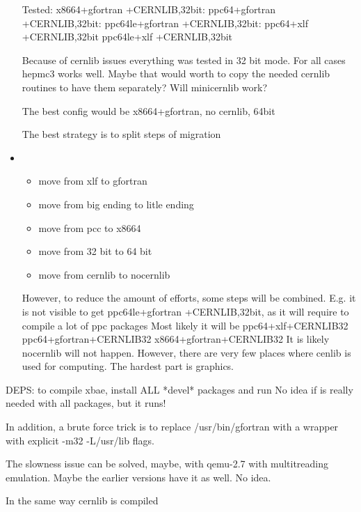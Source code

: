 \documentclass[a4paper,10pt]{article}
\begin{document}
\begin{itemize}
{\begin{itemize}
\end{itemize}
}
Tested:
x8664+gfortran +CERNLIB,32bit:  
ppc64+gfortran +CERNLIB,32bit:  
ppc64le+gfortran +CERNLIB,32bit:  
ppc64+xlf +CERNLIB,32bit
ppc64le+xlf +CERNLIB,32bit

Because of cernlib issues everything was tested in 32 bit mode.
For all cases hepmc3 works well.
Maybe that would worth to copy the needed cernlib routines to have them separately?
Will minicernlib work?

The best config would be 
x8664+gfortran, no cernlib, 64bit

The best strategy is to split steps of migration
\item {
\begin{itemize}
\item move from  xlf to gfortran
\item move from  big ending to litle ending
\item move from  pcc to x8664
\item move from 32 bit to 64 bit
\item move from cernlib to nocernlib
\end{itemize}
}
However, to reduce the amount of efforts, some steps will be combined.
E.g. it is not visible to get ppc64le+gfortran +CERNLIB,32bit, as it will require to compile a lot of ppc packages
Most likely it will be 
ppc64+xlf+CERNLIB32
ppc64+gfortran+CERNLIB32
x8664+gfortran+CERNLIB32
It is likely nocernlib will not happen.
However, there are very few places where cenlib is used for computing.
The hardest part is graphics.
\end{itemize}

DEPS:
to compile xbae, install ALL *devel* packages and run
No idea if %
is really needed with all packages, but it runs!

In addition, a brute force trick is to replace /usr/bin/gfortran with a wrapper with explicit -m32 -L/usr/lib flags.


The slowness issue can be solved, maybe, with qemu-2.7 with multitreading emulation.
Maybe the earlier versions have it as well. No idea.


In the same way cernlib is compiled
\end{document}
